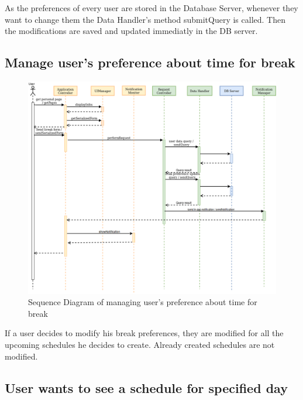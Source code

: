 \documentclass[numbers=noenddot, 12pt, a4paper, oneside]{scrbook}
\begin{document}
As the preferences of every user are stored in the Database Server, whenever they want to change them the Data Handler's method submitQuery is called. Then the modifications are saved and updated immediatly in the DB server. 

\subsection*{Manage user's preference about time for break}

\begin{figure}[H]
	\centering
	\includegraphics[width=1.1\textwidth,angle=-0]{images/Goal8}
	\caption{Sequence Diagram of managing user's preference about time for break}
\end{figure}

If a user decides to modify his break preferences, they are modified for all the upcoming schedules he decides to create. Already created schedules are not modified. 


\subsection*{User wants to see a schedule for specified day}
\end{document}
